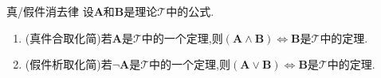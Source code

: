 \begin{metatheorem}{真/假件消去律}{}
	设$\boldsymbol{A}$和$\boldsymbol{B}$是理论$\mathcal{T}$中的公式.
	\begin{enumerate}
		\item (真件合取化简)若$\boldsymbol{A}$是$\mathcal{T}$中的一个定理,则$\left(\boldsymbol{A}\wedge\boldsymbol{B}\right)\iff\boldsymbol{B}$是$\mathcal{T}$中的定理.
		\item (假件析取化简)若$\neg\boldsymbol{A}$是$\mathcal{T}$中的一个定理,则$\left(\boldsymbol{A}\vee\boldsymbol{B}\right)\iff\boldsymbol{B}$是$\mathcal{T}$中的定理.
	\end{enumerate}
\end{metatheorem}